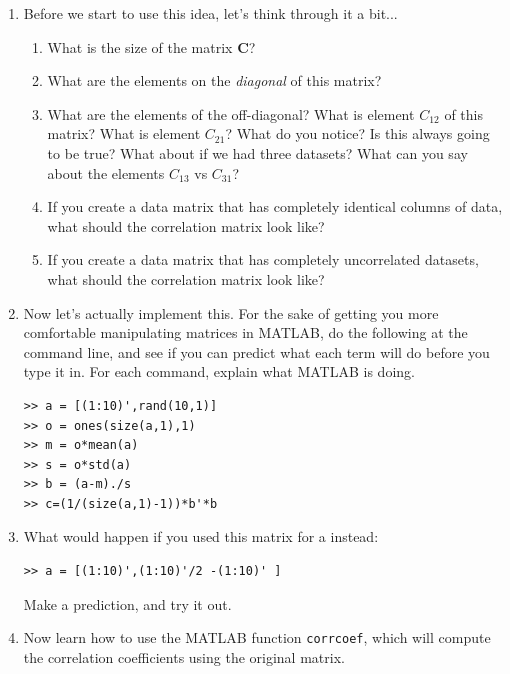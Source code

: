 \begin{prob}\label{ex:matlab-cor}
\begin{enumerate}
\item Before we start to use this idea, let's think through it a bit...
\begin{enumerate}
    \item  What is the size of the matrix $\mathbf{C}$?
    \item What are the elements on the \textit{diagonal} of this matrix?
    \item What are the elements of the off-diagonal?  What is element $C_{12}$ of this matrix?  What is element $C_{21}$?  What do you notice?  Is this always going to be true?  What about if we had three datasets?  What can you say about the elements $C_{13}$ vs $C_{31}$?
    \item  If you create a data matrix that has completely identical columns of data, what should the correlation matrix look like?
    \item  If you create a data matrix that has completely uncorrelated datasets, what should the correlation matrix look like?
\end{enumerate}
\item Now let's actually implement this. For the sake of getting you more comfortable manipulating matrices in MATLAB, do the following at the command line, and see if you can predict what each term will do before you type it in.  For each command, explain what MATLAB is doing.

\begin{verbatim}
>> a = [(1:10)',rand(10,1)]
>> o = ones(size(a,1),1)
>> m = o*mean(a)
>> s = o*std(a)
>> b = (a-m)./s
>> c=(1/(size(a,1)-1))*b'*b
\end{verbatim}
\item What would happen if you used this matrix for a instead:
\begin{verbatim}
>> a = [(1:10)',(1:10)'/2 -(1:10)' ]
\end{verbatim}
Make a prediction, and try it out.
\item Now learn how to use the MATLAB function \texttt{corrcoef}, which will compute the correlation coefficients using the original matrix.
\end{enumerate}
\end{prob}

